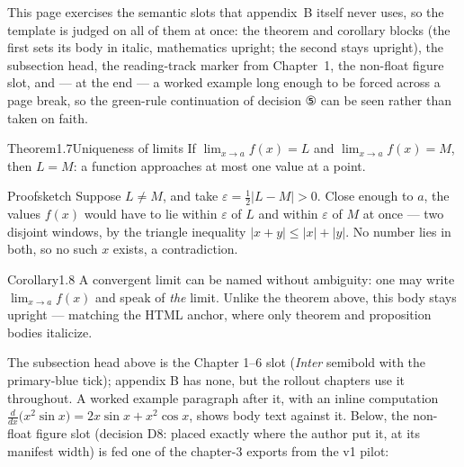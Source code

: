 \documentclass[a4paper,12pt,oneside]{memoir}
\begin{document}

This page exercises the semantic slots that appendix~B itself never uses, so the template is judged on all of them at once: the theorem and corollary blocks (the first sets its body in italic, mathematics upright; the second stays upright), the subsection head, the reading-track marker from Chapter~1, the non-float figure slot, and — at the end — a worked example long enough to be forced across a page break, so the green-rule continuation of decision ⑤ can be seen rather than taken on faith.


\begin{envtheorem}{Theorem}{1.7}{Uniqueness of limits}
If \(\lim_{x \to a} f(x) = L\) and \(\lim_{x \to a} f(x) = M\), then \(L = M\): a function approaches at most one value at a point.
\end{envtheorem}

\begin{envproof}{Proof}{}{sketch}
Suppose \(L \neq M\), and take \(\varepsilon = \tfrac{1}{2}\lvert L - M \rvert > 0\). Close enough to \(a\), the values \(f(x)\) would have to lie within \(\varepsilon\) of \(L\) and within \(\varepsilon\) of \(M\) at once — two disjoint windows, by the triangle inequality \(\lvert x + y \rvert \le \lvert x \rvert + \lvert y \rvert\). No number lies in both, so no such \(x\) exists, a contradiction. \qedmark
\end{envproof}

\begin{envcorollary}{Corollary}{1.8}{}
A convergent limit can be named without ambiguity: one may write \(\lim_{x \to a} f(x)\) and speak of \emph{the} limit. Unlike the theorem above, this body stays upright — matching the HTML anchor, where only theorem and proposition bodies italicize.
\end{envcorollary}


The subsection head above is the Chapter 1–6 slot (\emph{Inter} semibold with the primary-blue tick); appendix B has none, but the rollout chapters use it throughout. A worked example paragraph after it, with an inline computation \(\frac{d}{dx}\bigl(x^{2}\sin x\bigr) = 2x\sin x + x^{2}\cos x\), shows body text against it. Below, the non-float figure slot (decision D8: placed exactly where the author put it, at its manifest width) is fed one of the chapter-3 exports from the v1 pilot:
\end{document}

